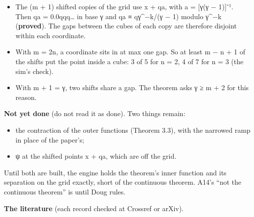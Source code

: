 \begin{enumerate}
\begin{itemize}
\item The (m + 1) shifted copies of the grid use x + qa, with a = [γ(γ − 1)]⁻¹. Then qa = 0.0qqq… in base γ and qa ≡ qγ\textasciicircum{}−k/(γ − 1) modulo γ\textasciicircum{}−k (\textbf{proved}). The gaps between the cubes of each copy are therefore disjoint within each coordinate.
\item With m = 2n, a coordinate sits in at max one gap. So at least m − n + 1 of the shifts put the point inside a cube: 3 of 5 for n = 2, 4 of 7 for n = 3 (the sim's check).
\item With m + 1 = γ, two shifts share a gap. The theorem asks γ ≥ m + 2 for this reason.
\end{itemize}
\end{enumerate}

\textbf{Not yet done} (do not read it as done). Two things remain:

\begin{itemize}
\item the contraction of the outer functions (Theorem 3.3), with the narrowed ramp in place of the paper's;
\item ψ at the shifted points x + qa, which are off the grid.
\end{itemize}

Until both are built, the engine holds the theorem's inner function and its separation on the grid exactly, short of the continuous theorem. A14's “not the continuous theorem” is until Doug rules.

\textbf{The literature} (each record checked at Crossref or arXiv).

